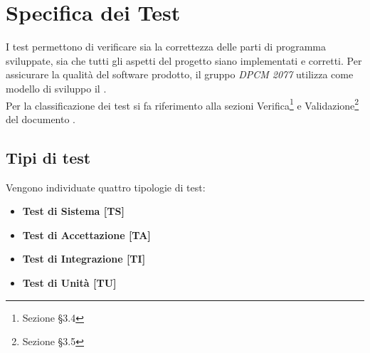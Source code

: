 
\section{Specifica dei Test}
I test permettono di verificare sia la correttezza delle parti di programma sviluppate, sia che tutti gli aspetti del progetto siano implementati e corretti.
Per assicurare la qualità del software prodotto, il gruppo \textit{DPCM 2077} utilizza come modello di sviluppo il .
\\
Per la classificazione dei test si fa riferimento alla sezioni Verifica\footnote{Sezione §3.4} e Validazione\footnote{Sezione §3.5} del documento .
	\subsection{Tipi di test}
	Vengono individuate quattro tipologie di test:
	\begin{itemize}
		\item \textbf{Test di Sistema [TS]}
		\item \textbf{Test di Accettazione [TA]}
		\item \textbf{Test di Integrazione [TI]}
		\item \textbf{Test di Unità [TU]}
	\end{itemize}
